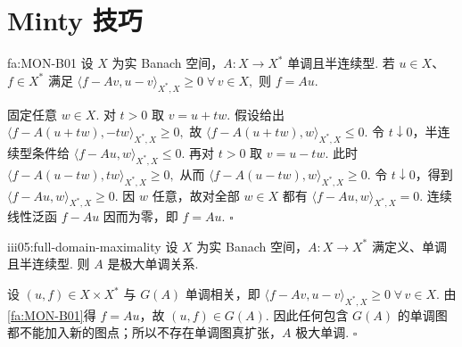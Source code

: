 \section{Minty 技巧}\label{sec:iii05-minty}

\begin{FALemma}[B][Minty 识别]{fa:MON-B01}
设 \(\displaystyle X\) 为实 Banach 空间，\(\displaystyle A:X\to X^*\) 单调且半连续型. 若 \(\displaystyle u\in X\)、\(\displaystyle f\in X^*\) 满足
\(\displaystyle \langle f-Av,u-v\rangle_{X^*,X}\geqslant0 \;\forall\,v\in X,\)
则 \(\displaystyle f=Au\).
\end{FALemma}

\begin{FAProof}
固定任意 \(\displaystyle w\in X\). 对 \(\displaystyle t>0\) 取 \(\displaystyle v=u+tw\). 假设给出
\(\displaystyle \langle f-A(u+tw),-tw\rangle_{X^*,X}\geqslant0,\)
故
\(\displaystyle \langle f-A(u+tw),w\rangle_{X^*,X}\leqslant0.\)
令 \(\displaystyle t\downarrow0\)，半连续型条件给
\(\displaystyle \langle f-Au,w\rangle_{X^*,X}\leqslant0.\)
再对 \(\displaystyle t>0\) 取 \(\displaystyle v=u-tw\). 此时
\(\displaystyle \langle f-A(u-tw),tw\rangle_{X^*,X}\geqslant0,\)
从而
\(\displaystyle \langle f-A(u-tw),w\rangle_{X^*,X}\geqslant0.\)
令 \(\displaystyle t\downarrow0\)，得到 \(\displaystyle\langle f-Au,w\rangle_{X^*,X}\geqslant0\). 因 \(\displaystyle w\) 任意，故对全部 \(\displaystyle w\in X\) 都有 \(\displaystyle\langle f-Au,w\rangle_{X^*,X}=0\). 连续线性泛函 \(\displaystyle f-Au\) 因而为零，即 \(\displaystyle f=Au\).
\hfill\(\square\)
\end{FAProof}

\begin{FACorollary}[B][满定义半连续型单调映射的极大性]{iii05:full-domain-maximality}
设 \(\displaystyle X\) 为实 Banach 空间，\(\displaystyle A:X\to X^*\) 满定义、单调且半连续型. 则 \(\displaystyle A\) 是极大单调关系.
\end{FACorollary}

\begin{FAProof}
设 \(\displaystyle(u,f)\in X\times X^*\) 与 \(\displaystyle G(A)\) 单调相关，即
\(\displaystyle \langle f-Av,u-v\rangle_{X^*,X}\geqslant0 \;\forall\,v\in X.\)
由\autoref{fa:MON-B01}得 \(\displaystyle f=Au\)，故 \(\displaystyle(u,f)\in G(A)\). 因此任何包含 \(\displaystyle G(A)\) 的单调图都不能加入新的图点；所以不存在单调图真扩张，\(\displaystyle A\) 极大单调.
\hfill\(\square\)
\end{FAProof}

